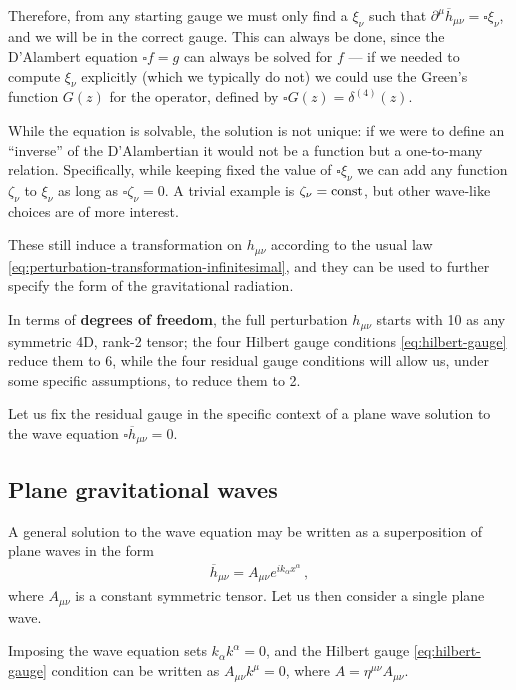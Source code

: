 \documentclass[main.tex]{subfiles}
\begin{document}
Therefore, from any starting gauge we must only find a \(\xi_{\nu }\) such that \(\partial^{\mu } \overline{h}_{\mu \nu } = \square \xi_{\nu }\), and we will be in the correct gauge. 
This can always be done, since the D'Alambert equation \(\square f = g\) can always be solved for \(f\) --- if we needed to compute \(\xi_{\nu }\) explicitly (which we typically do not) we could use the Green's function \(G(z)\) for the operator, defined by \(\square G(z) = \delta^{(4)} (z)\). 

While the equation is solvable, the solution is not unique: if we were to define an ``inverse'' of the D'Alambertian it would not be a function but a one-to-many relation. 
Specifically, while keeping fixed the value of \(\square \xi_{\nu }\) we can add any function \(\zeta_\nu \) to \(\xi _\nu  \) as long as \(\square \zeta _\nu = 0 \). 
A trivial example is \(\zeta _\nu = \mathrm{const}\), but other wave-like choices are of more interest. 

These still induce a transformation on \(h_{\mu \nu }\) according to the usual law \eqref{eq:perturbation-transformation-infinitesimal}, and they can be used to further specify the form of the gravitational radiation. 

In terms of \textbf{degrees of freedom}, the full perturbation \(h_{\mu \nu }\) starts with 10 as any symmetric 4D, rank-2 tensor; the four Hilbert gauge conditions \eqref{eq:hilbert-gauge} reduce them to 6, while the four residual gauge conditions will allow us, under some specific assumptions, to reduce them to 2. 

Let us fix the residual gauge in the specific context of a plane wave solution to the wave equation \(\square \overline{h}_{\mu \nu } = 0\).

\subsection{Plane gravitational waves} \label{sec:plane-gws}

A general solution to the wave equation may be written as a superposition of plane waves in the form
%
\begin{align}
\overline{h}_{\mu \nu } = A_{\mu \nu } e^{i k_\alpha x^{\alpha }}
\,,
\end{align}
%
where \(A_{\mu \nu }\) is a constant symmetric tensor.
Let us then consider a single plane wave.

Imposing the wave equation sets \(k_{\alpha } k^{\alpha } = 0\), and the Hilbert gauge \eqref{eq:hilbert-gauge} condition can be written as \(A_{\mu \nu } k^{\mu } = 0\), where \(A = \eta^{\mu \nu } A_{\mu \nu }\). 
\end{document}
